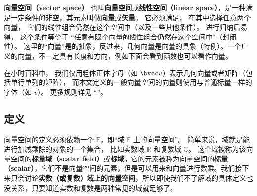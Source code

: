 
\begin{issues}
\issueTODO
\end{issues}


\textbf{向量空间（vector space）} 也叫\textbf{向量空间}或\textbf{线性空间（linear space）}，是一种满足一定条件的非空，其元素叫做\textbf{向量}或\textbf{矢量}。 它必须满足， 在其中选择任意两个向量， 它们的线性组合仍然在这个空间中（以及一些其他条件）。 进行归纳后易得， 这个条件等价于 “任意有限个向量的线性组合仍然在这个空间中”（封闭性）。 这里的“向量”是的抽象，反过来，几何向量是向量的具象（特例）。一个广义的向量，不一定具有长度和方向，例如下面会看到函数也可以看作向量。

在小时百科中， 我们仅用粗体正体字母（如 $\bvec v$）表示几何向量或者矩阵（包括单行单列的矩阵）， 而本文定义的一般向量空间的向量则使用与普通标量一样的字体（如 $v$）。 更多规则详见 “”。

\subsection{定义}
向量空间的定义必须依赖一个 $\mathbb F$，即“域 $\mathbb{F}$ 上的向量空间”。 简单来说，域就是能进行加减乘除的对象的一个集合， 比如实数域 $\mathbb R$ 和复数域 $\mathbb C$。 这个域被称为该向量空间的\textbf{标量域（scalar field）}或\textbf{标域}，它的元素被称为向量空间的\textbf{标量（scalar）}，它们不是向量空间的元素，但是可以用来和向量进行数乘。我们接下来只会讨论\textbf{实数（或复数）域上的向量空间}，所以即使我们不了解域的具体定义也没关系，只要知道实数和复数是两种常见的域就足够了。

